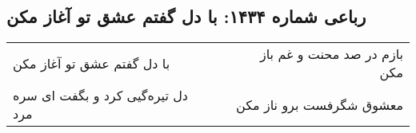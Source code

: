 \begin{center}
\section*{رباعی شماره ۱۴۳۴: با دل گفتم عشق تو آغاز مکن}
\label{sec:1434}
\begin{longtable}{l p{0.5cm} r}
با دل گفتم عشق تو آغاز مکن
&&
بازم در صد محنت و غم باز مکن
\\
دل تیره‌گیی کرد و بگفت ای سره مرد
&&
معشوق شگرفست برو ناز مکن
\\
\end{longtable}
\end{center}

